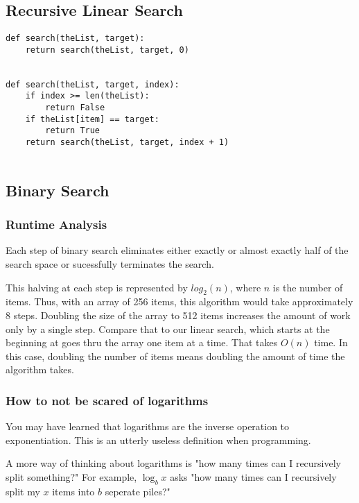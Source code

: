 \subsection{Recursive Linear Search}




\begin{verbatim}
def search(theList, target):
	return search(theList, target, 0)


def search(theList, target, index):
	if index >= len(theList):
		return False 
	if theList[item] == target:
		return True
	return search(theList, target, index + 1)
	
\end{verbatim}


\subsection{Binary Search}






\subsubsection{Runtime Analysis}
Each step of binary search eliminates either exactly or almost exactly half of the search space or sucessfully terminates the search.

This halving at each step is represented by $log_2(n)$, where $n$ is the number of items.  Thus, with an array of 256 items, this algorithm would take approximately 8 steps. Doubling the size of the array to 512 items increases the amount of work only by a single step.   Compare that to our linear search, which starts at the beginning at goes thru the array one item at a time.  That takes $O(n)$ time.  In this case, doubling the number of items means doubling the amount of time the algorithm takes.





\subsubsection{How to not be scared of logarithms }
You may have learned that logarithms are the inverse operation to exponentiation.
This is an utterly useless definition when programming.


A more way of thinking about logarithms is "how many times can I recursively split something?"
For example, $\log_b x$ asks "how many times can I recursively split my $x$ items into $b$ seperate piles?"

